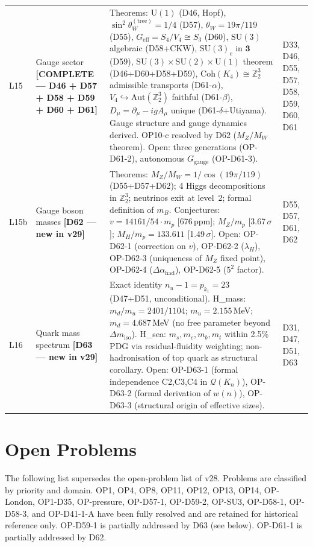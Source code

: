 \documentclass[11pt,a4paper]{article}
\theoremstyle{plain}
\theoremstyle{definition}
\theoremstyle{remark}
\newcommand{\Uone}{\mathrm{U}(1)}
\newcommand{\SUtwo}{\mathrm{SU}(2)}
\newcommand{\SUthree}{\mathrm{SU}(3)}
\newcommand{\Coh}{\mathrm{Coh}(K_4)}
\begin{document}
\begin{longtable}{L{0.6cm}L{3.0cm}L{5.5cm}L{4.0cm}}
L15 & Gauge sector \textbf{[COMPLETE --- D46 + D57 + D58 + D59 + D60 + D61]} & \textcolor{proofblue}{Theorems}: $\Uone$ (D46, Hopf), $\sin^2\theta_W^{(\mathrm{tree})}=1/4$ (D57), $\theta_W=19\pi/119$ (D55), $G_{\mathrm{eff}}=S_4/V_4\cong S_3$ (D60), $\SUthree$ algebraic (D58+CKW), $\SUthree_c$ in $\mathbf{3}$ (D59), $\SUthree\times\SUtwo\times\Uone$ theorem (D46+D60+D58+D59), $\Coh\cong\mathbb{Z}_2^3$ admissible transports (D61-$\alpha$), $V_4\hookrightarrow\mathrm{Aut}(\mathbb{Z}_2^3)$ faithful (D61-$\beta$), $D_\mu=\partial_\mu-igA_\mu$ unique (D61-$\delta$+Utiyama). Gauge structure and gauge dynamics derived. OP10-c resolved by D62 ($M_Z/M_W$ theorem). Open: three generations (OP-D61-2), autonomous $G_{\mathrm{gauge}}$ (OP-D61-3). & D33, D46, D55, D57, D58, D59, D60, D61\\[0.3em]
L15b & Gauge boson masses \textbf{[D62 --- new in v29]} & \textcolor{proofblue}{Theorems}: $M_Z/M_W = 1/\cos(19\pi/119)$ (D55+D57+D62); 4 Higgs decompositions in $\mathbb{Z}_2^3$; neutrinos exit at level~2; formal definition of $m_B$. \textcolor{conjecturegreen}{Conjectures}: $v = 14161/54\cdot m_p$ [676\,ppm]; $M_Z/m_p$ [3.67\,$\sigma$]; $M_H/m_p = 133.611$ [1.49\,$\sigma$]. Open: OP-D62-1 (correction on $v$), OP-D62-2 ($\lambda_H$), OP-D62-3 (uniqueness of $M_Z$ fixed point), OP-D62-4 ($\Delta\alpha_{\mathrm{had}}$), OP-D62-5 ($5^2$ factor). & D55, D57, D61, D62\\[0.3em]
L16 & Quark mass spectrum \textbf{[D63 --- new in v29]} & Exact identity $n_u - 1 = p_{k_1} = 23$ (D47+D51, \textcolor{proofblue}{unconditional}). \textcolor{conjecturegreen}{H\_mass}: $m_d/m_u = 2401/1104$; $m_u = 2.155$\,MeV; $m_d = 4.687$\,MeV (no free parameter beyond $\Delta m_{\mathrm{iso}}$). \textcolor{conjecturegreen}{H\_sea}: $m_s, m_c, m_b, m_t$ within 2.5\% PDG via residual-fluidity weighting; non-hadronisation of top quark as structural corollary. Open: OP-D63-1 (formal independence C2,C3,C4 in $\mathcal{Q}(K_n)$), OP-D63-2 (formal derivation of $w(n)$), OP-D63-3 (structural origin of effective sizes). & D31, D47, D51, D63\\[0.3em]
\end{longtable}

\section{Open Problems}
\label{sec:openproblems}

The following list supersedes the open-problem list of v28. Problems are classified by priority and domain. OP1, OP4, OP8, OP11, OP12, OP13, OP14, OP-London, OP1-D35, OP-pressure, OP-D57-1, OP-D59-2, OP-SU3, OP-D58-1, OP-D58-3, and OP-D41-1-A have been fully resolved and are retained for historical reference only. OP-D59-1 is partially addressed by D63 (see below). OP-D61-1 is partially addressed by D62.
\end{document}
